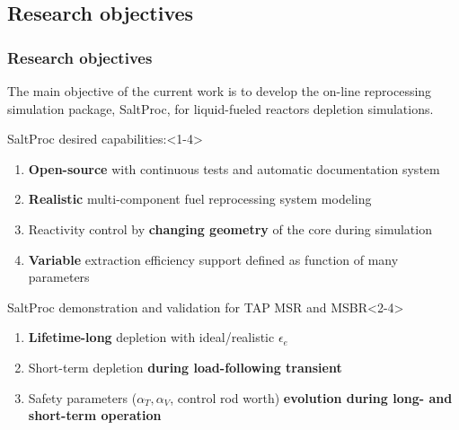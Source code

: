 \subsection{Research objectives}

\begin{frame}
  \frametitle{Research objectives}
                  \vspace*{-0.05in}
      The main objective of the current work is to develop the on-line  
      reprocessing simulation package, SaltProc, for liquid-fueled reactors 
      depletion simulations.
     \begin{block}{SaltProc desired capabilities:}<1-4>
         \begin{enumerate}
                \item \textbf{Open-source} with continuous tests and 
				automatic documentation system 
                \item \textbf{Realistic} multi-component fuel 
                reprocessing system modeling
                \item Reactivity control by \textbf{changing geometry} of 
                the core during simulation
                \item \textbf{Variable} extraction efficiency support defined 
                as function of many parameters
         \end{enumerate}
      \end{block}
            \vspace{-0.1in}
	\begin{block}{SaltProc demonstration and validation for TAP MSR and 
	MSBR}<2-4>
		\begin{enumerate}
			\item<2-4> \textbf{Lifetime-long} depletion with ideal/realistic 
			$\epsilon_e$
			\item<3-4> Short-term depletion \textbf{during load-following 
			transient}
			\item<4> Safety parameters ($\alpha_{T}, \alpha_{V}$, control rod 
			worth) \textbf{evolution during long- and short-term operation}
		\end{enumerate}
	\end{block}
\end{frame}

